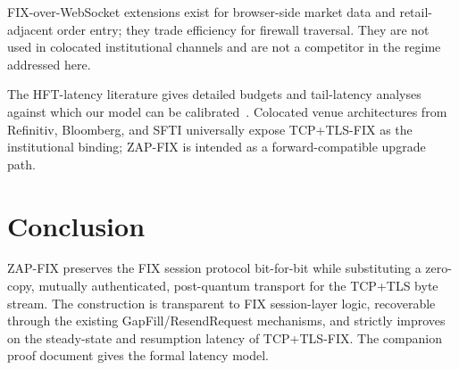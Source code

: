 \documentclass[11pt,a4paper]{article}
\begin{document}
FIX-over-WebSocket extensions exist for browser-side market data and
retail-adjacent order entry; they trade efficiency for firewall
traversal. They are not used in colocated institutional channels
and are not a competitor in the regime addressed here.

The HFT-latency literature gives detailed budgets and tail-latency
analyses against which our model can be
calibrated~\cite{hasbrouck2013,kissell2013,latencylottery}.
Colocated venue architectures from Refinitiv, Bloomberg, and SFTI
universally expose TCP+TLS-FIX as the institutional binding;
ZAP-FIX is intended as a forward-compatible upgrade path.

\section{Conclusion}

ZAP-FIX preserves the FIX session protocol bit-for-bit while
substituting a zero-copy, mutually authenticated, post-quantum
transport for the TCP+TLS byte stream. The construction is
transparent to FIX session-layer logic, recoverable through the
existing GapFill/ResendRequest mechanisms, and strictly improves on
the steady-state and resumption latency of TCP+TLS-FIX. The
companion proof document gives the formal latency model.



\end{document}
